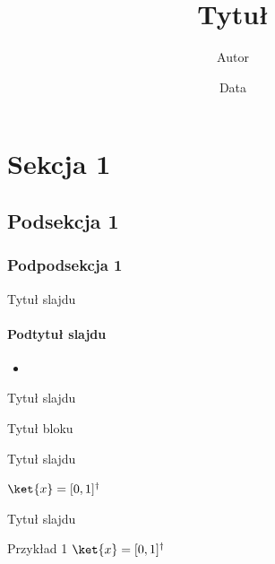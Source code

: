 \documentclass[11pt, xcolor={dvipsnames,svgnames},aspectratio=169]{beamer}
\title[]{Tytuł}
\date{Data}
\author{Autor}
\begin{document}
\begingroup
\nologo
\frame{\maketitle}
\endgroup

\theoremstyle{plain}

\section{Sekcja 1}
\subsection{Podsekcja 1}
\subsubsection{Podpodsekcja 1}

\begin{frame}{Tytuł slajdu}
	\framesubtitle{Podtytuł slajdu}
	\begin{itemize}
		\item \lipsum[1]
	\end{itemize}
\end{frame}

\begin{frame}{Tytuł slajdu}
	\begin{block}{Tytuł bloku}
		\lipsum[1]
	\end{block}
\end{frame}

\begin{frame}{Tytuł slajdu}
	\begin{theorem}
		$\ket{x}=[0,1]^\dagger$
	\end{theorem}
\end{frame}

\begin{frame}{Tytuł slajdu}
	\begin{exampleblock}{Przykład 1}
		$\ket{x}=[0,1]^\dagger$
	\end{exampleblock}
\end{frame}
\end{document}
